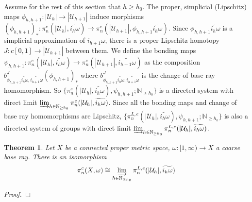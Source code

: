 \documentclass[a4paper,11pt]{article}
\theoremstyle{definition}
\theoremstyle{plain}
\newtheorem{theorem}[definition]{Theorem}
\theoremstyle{remark}
\begin{document}
{Assume for the rest of this section that $h\geq h_0$. The proper, simplicial (Lipschitz) maps $\phi_{h,h+1}: |\mathcal{U}_{h}|\rightarrow |\mathcal{U}_{h+1}|$ induce morphisms $(\phi_{h,h+1})_{\ast}: \pi_{n}^e(|\mathcal{U}_{h}|,\widetilde{i_{h}\omega})\rightarrow \pi_{n}^e(|\mathcal{U}_{h+1}|,\phi_{h,h+1}\widetilde{i_{h}\omega})$. Since $\phi_{h,h+1} \widetilde{i_{h}\omega}$ is a simplicial approximation of $i_{h+1} \omega$, there is a proper Lipschitz homotopy $J: c[0,1]\rightarrow |\mathcal{U}_{h+1}|$ between them. We define the bonding maps $\psi_{h,h+1}: \pi^{e}_{n}(|\mathcal{U}_{h}|, \widetilde{i_{h}\omega})\rightarrow \pi_{n}^{e}(|\mathcal{U}_{h+1}|,\widetilde{i_{h+1}\omega})$ as the composition $b^{J}_{\phi_{h,h+1} \widetilde{i_{h}\omega}, \widetilde{i_{h+1}\omega}}(\phi_{h,h+1})_{\ast}$ where $b^{J}_{\phi_{h,h+1} \widetilde{i_{h}\omega}, \widetilde{i_{h+1}\omega}}$ is the change of base ray homomorphism. So $\{\pi_{n}^{e}(|\mathcal{U}_{h}|, \widetilde{i_{h}\omega}), \psi_{h,h+1}; \mathbb{N}_{\geq h_0}\}$ is a directed system with direct limit $\varinjlim_{h\in \mathbb{N}_{\geq h_0}}\pi^{e}_{n}(|\mathcal{U}_{h}|, \widetilde{i_{h}\omega})$. Since all the bonding maps and change of base ray homomorphisms are Lipschitz, $\{\pi_{n}^{L,e}(|\mathcal{U}_{h}|, \widetilde{i_{h}\omega}), \psi_{h,h+1}; \mathbb{N}_{\geq h_0}\}$ is also a directed system of groups with direct limit $\varinjlim_{h\in \mathbb{N}_{\geq h_0}}\pi^{L,e}_{n}(|\mathcal{U}_{h}|, \widetilde{i_{h}\omega})$. 

\begin{theorem} \label{endhomosiso} Let $X$ be a connected proper metric space, $\omega: [1,\infty)\rightarrow X$ a coarse base ray. There is an isomorphism 
\begin{align*}
\pi_{n}^{c}(X,\omega)\cong \varinjlim_{h\in \mathbb{N}_{\geq h_0}}\pi^{L,e}_{n}(|\mathcal{U}_{h}|, \widetilde{i_{h}\omega})
\end{align*} 
\end{theorem}


\begin{proof} 



\end{proof}}
\end{document}

